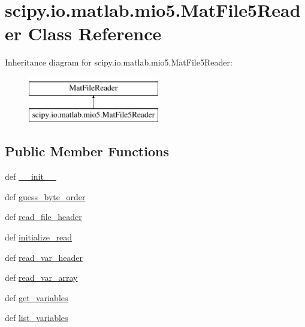 \hypertarget{classscipy_1_1io_1_1matlab_1_1mio5_1_1MatFile5Reader}{}\section{scipy.\+io.\+matlab.\+mio5.\+Mat\+File5\+Reader Class Reference}
\label{classscipy_1_1io_1_1matlab_1_1mio5_1_1MatFile5Reader}
Inheritance diagram for scipy.\+io.\+matlab.\+mio5.\+Mat\+File5\+Reader\+:\begin{figure}[H]
\begin{center}
\leavevmode
\includegraphics[height=2.000000cm]{classscipy_1_1io_1_1matlab_1_1mio5_1_1MatFile5Reader}
\end{center}
\end{figure}
\subsection*{Public Member Functions}
\begin{DoxyCompactItemize}
\item 
def \hyperlink{classscipy_1_1io_1_1matlab_1_1mio5_1_1MatFile5Reader_a1aeaab025fda79263f766eeb6e02ae6d}{\+\_\+\+\_\+init\+\_\+\+\_\+}
\item 
def \hyperlink{classscipy_1_1io_1_1matlab_1_1mio5_1_1MatFile5Reader_ad0155765772c1349d5ab672a627d0568}{guess\+\_\+byte\+\_\+order}
\item 
def \hyperlink{classscipy_1_1io_1_1matlab_1_1mio5_1_1MatFile5Reader_a6488410a90cb27d3e5f5d96caad19102}{read\+\_\+file\+\_\+header}
\item 
def \hyperlink{classscipy_1_1io_1_1matlab_1_1mio5_1_1MatFile5Reader_a2030efac4ca178827d82d4c0fdcc1b6a}{initialize\+\_\+read}
\item 
def \hyperlink{classscipy_1_1io_1_1matlab_1_1mio5_1_1MatFile5Reader_afca7c913616a81f180b5111006ed306d}{read\+\_\+var\+\_\+header}
\item 
def \hyperlink{classscipy_1_1io_1_1matlab_1_1mio5_1_1MatFile5Reader_a64e90c885ca9767b6a3fe759559e2e95}{read\+\_\+var\+\_\+array}
\item 
def \hyperlink{classscipy_1_1io_1_1matlab_1_1mio5_1_1MatFile5Reader_af2dff34c68ad0b28b0e39e140ad610c6}{get\+\_\+variables}
\item 
def \hyperlink{classscipy_1_1io_1_1matlab_1_1mio5_1_1MatFile5Reader_a15ce78fcef8ecec20b1ed50ce7cca2ca}{list\+\_\+variables}
\end{DoxyCompactItemize}
